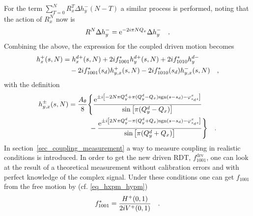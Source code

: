 %
For the term $\sum\limits_{T = 0}^N R_x^{T}\Delta h_y^-(N-T) $ a similar process is performed, noting that
the action of $R_x^N$ now is 
%
\begin{equation}
R^N\Delta h_y^- = \text{e}^{-2 i \pi N Q_x} \Delta h_y^-
\quad .
\end{equation}
%
Combining the above, the expression for the coupled driven motion becomes
%
\begin{align}
    h_x^+(s,N)&=
    h_x^{d+}(s,N) + 2if^{*}_{1001}  h_y^{d+}(s,N) + 2if^{*}_{1010} h_y^{d-} \notag \\
    &\quad
    -2if^*_{1001}(s_d) h_{y,x}^+(s,N)
    -2if^*_{1010}(s_d) h_{y,x}^-(s,N)
    \quad ,
\end{align}
with the definition
%
\begin{align}
    h_{y,x}^\pm(s,N) &= 
        \frac{A_\theta}{8} \Bigg\{
             \frac{\text{e}^{\pm i \left[-2N \pi Q_y^d + \pi( Q_y^d - Q_x )\text{sgn}(s-s_d) - \varphi_{s_ds}^{x}\right]}}
                {\sin\left[\pi (Q_y^d - Q_x)\right]}
                \notag \\  & \quad\quad\quad
            -\frac{\text{e}^{ \pm i \left[2N\pi Q_y^d - \pi( Q_y^d + Q_x )\text{sgn}(s-s_d) - \varphi_{s_ds}^{x}\right]}}
                {\sin\left[\pi (Q_y^d + Q_x)\right]}
        \Bigg\}
        \quad .
\end{align}
%
%
In section~\ref{sec_coupling_measurement} a way to measure coupling in realistic conditions is introduced.
In order to get the new driven RDT, $f_{1001}^\text{drv}$, one can look at the result of a theoretical
measurement without calibration errors and with perfect knowledge of the complex signal.
Under these conditions one can get $f_{1001}$ from the free motion by (cf. \eqref{eq_hxpm_hypm})
%
\begin{equation}
    f_{1001}^* = \frac{H^+(0,1)}{2iV^+(0,1)}
    \label{eq_f1001_from_complex}
    \quad .
\end{equation}

